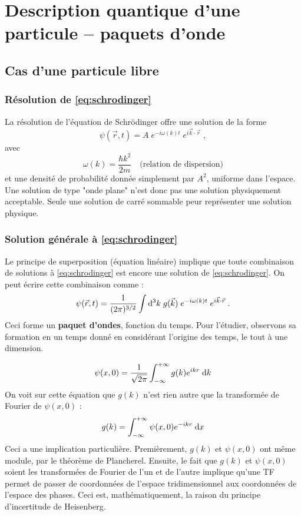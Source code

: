 \documentclass[12pt, a4paper]{book}
\begin{document}
\section{Description quantique d'une particule -- paquets d'onde}
\subsection{Cas d'une particule libre}
\subsubsection{Résolution de \eqref{eq:schrodinger}}
La résolution de l'équation de Schrödinger offre une solution de la forme 
\begin{equation}\label{eq:solution_schrod}
\psi(\vec r, t) = A \; e^{-i\omega(k) t} \; e ^{i \vec k \cdot \vec r} \; ,
\end{equation}
avec 
\begin{equation}\label{eq:relation_dispersion}
\omega(k) = \dfrac{\hbar k^2}{2m} \quad \text{(relation de dispersion)}
\end{equation}
et une densité de probabilité donnée simplement par $A^2$, uniforme dans l'espace. Une solution de type "onde plane" n'est donc pas une solution physiquement acceptable. Seule une solution de carré sommable peur représenter une solution physique.
\subsubsection{Solution générale à \eqref{eq:schrodinger}}
Le principe de superposition (équation linéaire) implique que toute combinaison de solutions à \eqref{eq:schrodinger} est encore une solution de \eqref{eq:schrodinger}. On peut écrire cette combinaison comme :
\begin{equation} \label{eq:schrod_sol_gen}
\psi(\vec r, t) = \dfrac{1}{(2\pi)^{3/2}} \int \mathrm{d} ^3 k \; g(\vec k) \; e^{-i\omega(k) t} \; e^{i\vec k \cdot \vec r} \; .
\end{equation}
Ceci forme un \textbf{paquet d'ondes}, fonction du temps. Pour l'étudier, observons sa formation en un temps donné en considérant l'origine des temps, le tout à une dimension.

$$\psi(x,0) = \dfrac{1}{\sqrt{2\pi}} \int_{-\infty} ^{+\infty} g(k) e^{ikr} \; \mathrm{d} k $$
On voit sur cette équation que $g(k)$ n'est rien autre que la transformée de Fourier de $\psi(x,0)$ :
$$g(k) = \int_{-\infty} ^{+\infty} \psi(x,0) e^{-ikr} \; \mathrm{d} x $$
Ceci a une implication particulière. Premièrement, $g(k)$ et $\psi(x,0)$ ont même module, par le théorème de Plancherel. Ensuite, le fait que $g(k)$ et $\psi(x,0)$ soient les transformées de Fourier de l'un et de l'autre implique qu'une TF permet de passer de coordonnées de l'espace tridimensionnel aux coordonnées de l'espace des phases. Ceci est, mathématiquement, la raison du principe d'incertitude de Heisenberg.
\end{document}
